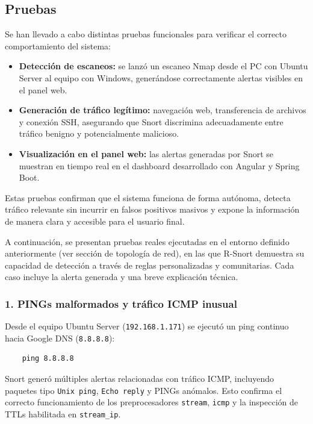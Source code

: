 \documentclass[12pt,a4paper]{report}
\begin{document}
\subsection{Pruebas}

Se han llevado a cabo distintas pruebas funcionales para verificar el correcto comportamiento del sistema:

\begin{itemize}
	\item \textbf{Detección de escaneos:} se lanzó un escaneo Nmap desde el PC con Ubuntu Server al equipo con Windows, generándose correctamente alertas visibles en el panel web.
	\item \textbf{Generación de tráfico legítimo:} navegación web, transferencia de archivos y conexión SSH, asegurando que Snort discrimina adecuadamente entre tráfico benigno y potencialmente malicioso.
	\item \textbf{Visualización en el panel web:} las alertas generadas por Snort se muestran en tiempo real en el dashboard desarrollado con Angular y Spring Boot.
\end{itemize}

Estas pruebas confirman que el sistema funciona de forma autónoma, detecta tráfico relevante sin incurrir en falsos positivos masivos y expone la información de manera clara y accesible para el usuario final.\newline

A continuación, se presentan pruebas reales ejecutadas en el entorno definido anteriormente (ver sección de topología de red), en las que R-Snort demuestra su capacidad de detección a través de reglas personalizadas y comunitarias. Cada caso incluye la alerta generada y una breve explicación técnica.

\vspace{0.5cm}

\subsubsection*{1. PINGs malformados y tráfico ICMP inusual}

Desde el equipo Ubuntu Server (\texttt{192.168.1.171}) se ejecutó un ping continuo hacia Google DNS (\texttt{8.8.8.8}):

\begin{verbatim}
	ping 8.8.8.8
\end{verbatim}

Snort generó múltiples alertas relacionadas con tráfico ICMP, incluyendo paquetes tipo \texttt{Unix ping}, \texttt{Echo reply} y PINGs anómalos. Esto confirma el correcto funcionamiento de los preprocesadores \texttt{stream}, \texttt{icmp} y la inspección de TTLs habilitada en \texttt{stream\_ip}.
\end{document}
